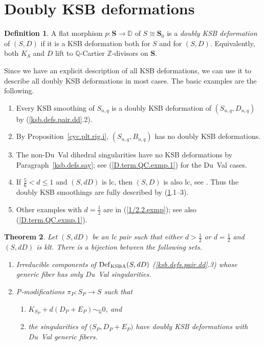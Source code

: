 \documentclass{amsart}
\newtheorem{thm}{Theorem}%
\theoremstyle{definition}
\newtheorem{defn}[thm]{Definition}
\theoremstyle{remark}
\newcommand{\z}[0]{{\mathbb Z}}
\newcommand{\dd}[0]{{\mathbb D}}
\newcommand{\q}[0]{{\mathbb Q}}
\newcommand{\simq}[0]{\sim_{\q}}
\newcommand{\defsp}[0]{\operatorname{Def}}
\begin{document}
\section{Doubly KSB deformations}\label{0-1.sec}




\begin{defn}\label{2-KSB.defn} A flat morphism 
  $p: {\mathbf S}\to \dd$   of $S\cong {\mathbf S}_0$  is a {\it doubly KSB deformation} of $(S, D)$ if
  it is a KSB deformation both for $S$ and for  $(S, D)$.
  Equivalently, both $K_S$ and $D$ lift to $\q$-Cartier $\z$-divisors on
  ${\mathbf S}$.

  Since we have an explicit description of all  KSB deformations,
  we can use it to describe all doubly KSB deformations in most cases. The basic examples are the following.
\begin{enumerate}
 \item Every KSB smoothing of $S_{n,q}$ is a
  doubly KSB deformation of  $(S_{n,q}, D_{n,q})$ by (\ref{ksb.defs.pair.dd}.2).
\item By Proposition~\ref{cyc.plt.rig.i}, $(S_{n,q}, B_{n,q})$ has no doubly KSB deformations.
  \item The non-Du~Val dihedral singularities  have no  KSB deformations by Paragraph~\ref{ksb.defs.say}; see (\ref{D.term.QC.exmp.1}) for the Du~Val cases.
\item 
  If  $\frac56<d\leq 1$ and $(S,dD)$ is lc, then $(S, D)$ is also lc, see \cite[3.44]{kk-singbook}.
  Thus the doubly KSB smoothings are fully described by (\ref{2-KSB.defn}.1--3).
\item Other examples with $d=\frac12$ are in (\ref{1/2.2.exmp});
  see also (\ref{D.term.QC.exmp.1}).
\end{enumerate}

\end{defn}




\begin{thm}\label{K+D.KSB.P.thm}  Let $(S, dD)$ be an lc pair such that
  either $d>\frac12 $ or $d=\frac12$ and   $(S, dD)$ is klt.
  There is a bijection between the following sets.
\begin{enumerate}
\item  \label{K+D.KSB.P.thm.1}
  Irreducible components of $\defsp_{\rm KSBA}(S, dD)$ (\ref{ksb.defs.pair.dd}.3) whose generic fiber has only Du~Val singularities.
\item \label{K+D.KSB.P.thm.2}
  P-modifications $\pi_P:S_P\to S$ such that
  \begin{enumerate}
\item  \label{K+D.KSB.P.thm.2.a} $K_{S_P}+d(D_P+E_P)\simq 0$, and
\item   \label{K+D.KSB.P.thm.2.b} the singularities of $\bigl(S_P, D_P+E_P\bigr)$ have doubly KSB deformations with Du~Val  generic fibers.
 \end{enumerate}
\end{enumerate}
\end{thm}
\end{document}
